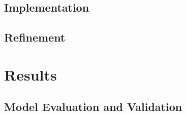 \documentclass[a4paper,10pt]{article}
\begin{document}
\subsection{Implementation}

\subsection{Refinement}

\section{Results}

\subsection{Model Evaluation and Validation}
\end{document}
